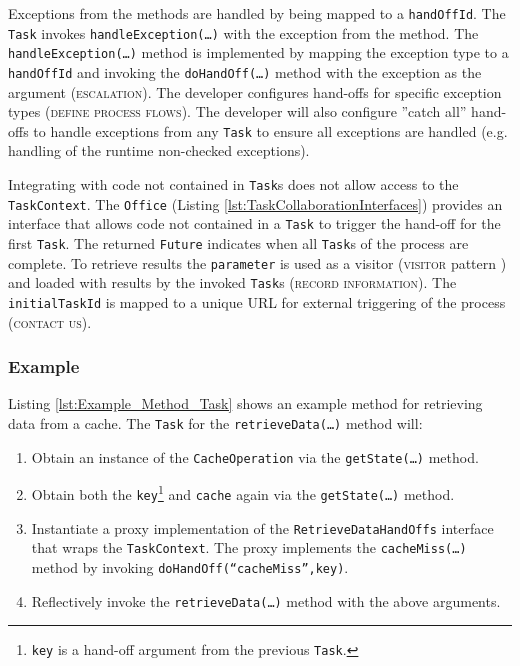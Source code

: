 \documentclass[prodmode]{style/acmlarge}
\begin{document}
Exceptions from the methods are handled by being mapped to a \texttt{handOffId}.
The \texttt{Task} invokes \texttt{handle\-Excep\-tion(\ldots)} with the
exception from the method.  The \texttt{handleException(\ldots)} method is
implemented by mapping the exception type to a \texttt{handOffId} and invoking
the \texttt{doHandOff(\ldots)} method with the exception as the argument
(\textsc{escalation}).  The developer configures hand-offs for specific
exception types (\textsc{define process flows}).  The developer will also
configure ''catch all'' hand-offs to handle exceptions from any \texttt{Task} to
ensure all exceptions are handled (e.g. handling of the runtime non-checked
exceptions).

Integrating with code not contained in \texttt{Task}s does not allow access to
the \texttt{TaskContext}.  The \texttt{Office} (Listing
\ref{lst:TaskCollaborationInterfaces}) provides an interface that allows code
not contained in a \texttt{Task} to trigger the hand-off for the first
\texttt{Task}.  The returned \texttt{Future} indicates when all \texttt{Task}s
of the process are complete.  To retrieve results the \texttt{parameter} is used
as a visitor (\textsc{visitor} pattern \cite{gof}) and loaded with results by
the invoked \texttt{Task}s (\textsc{record information}).  The
\texttt{initialTaskId} is mapped to a unique URL for external triggering of the
process (\textsc{contact us}).



\subsubsection*{Example}

Listing \ref{lst:Example_Method_Task} shows an example method for retrieving
data from a cache.  The \texttt{Task} for the \texttt{retrieve\-Data(\ldots)}
method will:
\begin{enumerate}
  \item Obtain an instance of the \texttt{CacheOperation} via the \texttt{getState(\ldots)} method.
  \item Obtain both the \texttt{key}\footnote{\texttt{key} is a hand-off argument from the previous \texttt{Task}.} and \texttt{cache} again via the \texttt{getState(\ldots)} method.
  \item Instantiate a proxy implementation of the \texttt{RetrieveDataHandOffs} interface that wraps the \texttt{TaskContext}.  The proxy implements the \texttt{cacheMiss(\ldots)} method by invoking \texttt{doHandOff(``cacheMiss'',key)}. 
  \item Reflectively invoke the \texttt{retrieveData(\ldots)} method with the above arguments.
\end{enumerate}
\end{document}
